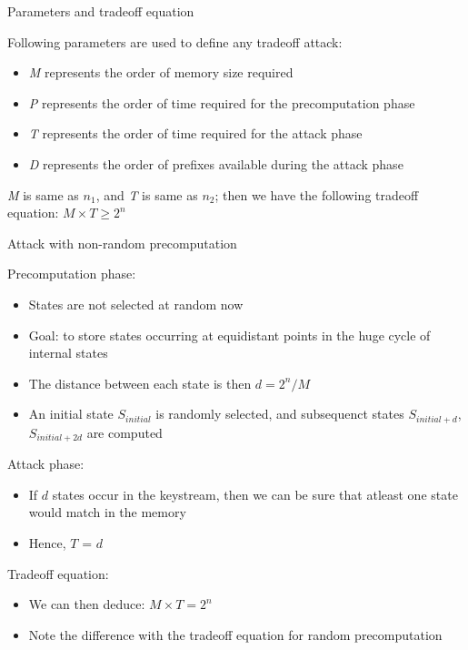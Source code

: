 \documentclass{beamer}
\begin{document}
\begin{frame}{Parameters and tradeoff equation}

\begin{itemize}
\small{	
	\item Following parameters are used to define any tradeoff attack:
	\begin{itemize}
	\item \emph{M} represents the order of memory size required
	\item \emph{P} represents the order of time required for the precomputation phase
	\item \emph{T} represents the order of time required for the attack phase
	\item \emph{D} represents the order of prefixes available during the attack phase
	\end{itemize}
	\item \emph{M} is same as $n_1$, and \emph{T} is same as $n_2$; then we have the following tradeoff equation: $M \times T \geq 2^n$
}
\end{itemize}
\end{frame}

\begin{frame}{Attack with non-random precomputation}
\begin{itemize}
\small{
	\item Precomputation phase:
	\begin{itemize}
	\item States are not selected at random now
	\item Goal: to store states occurring at equidistant points in the huge cycle of internal states
	\item The distance between each state is then $d = 2^n/M$	
	\item An initial state $S_{initial}$ is randomly selected, and subsequenct states $S_{initial+d}$, $S_{initial+2d}$ are computed

	\end{itemize}
	\item Attack phase:
	\begin{itemize}
		\item If $d$ states occur in the keystream, then we can be sure that atleast one state would match in the memory
		\item Hence, $T$ =  $d$
	\end{itemize}
	\item Tradeoff equation:
	\begin{itemize}
		\item We can then deduce: $M \times T = 2^n$
		\item Note the difference with the tradeoff equation for random precomputation
	\end{itemize}
	
}	
\end{itemize}
\end{frame}
\end{document}

